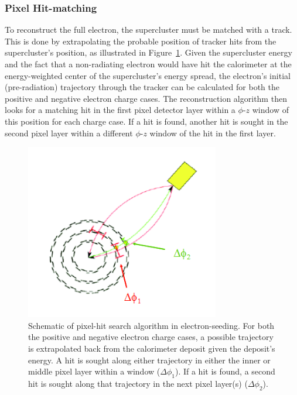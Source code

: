 
\subsubsection{Pixel Hit-matching}
\label{evReco:pixMatch}

To reconstruct the full electron, 
the supercluster must be matched with a track.  
This is done by extrapolating the probable position of 
tracker hits from the supercluster's position, 
as illustrated in Figure~\ref{fig:PixMatch}.  
Given the supercluster energy and the fact that a 
non-radiating electron would have hit the calorimeter 
at the energy-weighted center of the supercluster's 
energy spread, 
the electron's initial (pre-radiation) trajectory 
through the tracker can be calculated 
for both the positive and negative electron 
charge cases.  
The reconstruction algorithm then looks for a matching 
hit in the first pixel detector layer 
within a $\phi$-$z$ window of this position 
for each charge case.  
If a hit is found, another hit is sought in the second 
pixel layer within a different $\phi$-$z$ window 
of the hit in the first layer.  


 \begin{figure}[htb]
  \begin{center}
    \includegraphics[width=240pt]{Figures/elec-pixmatch.png}
  \end{center}
  \caption[\fixspacing Schematic of pixel-hit search algorithm in electron-seeding]
	  {\fixspacing Schematic of pixel-hit search algorithm in electron-seeding. 
	    For both the positive and negative electron charge cases, 
	    a possible trajectory is extrapolated back from the calorimeter deposit 
	    given the deposit's energy. 
	    A hit is sought along either trajectory in either the inner or 
	    middle pixel layer within a window ($\Delta\phi_1$). 
	    If a hit is found, a second hit is sought along that trajectory 
	    in the next pixel layer(s) ($\Delta\phi_2$).}
  \label{fig:PixMatch}
 \end{figure}

